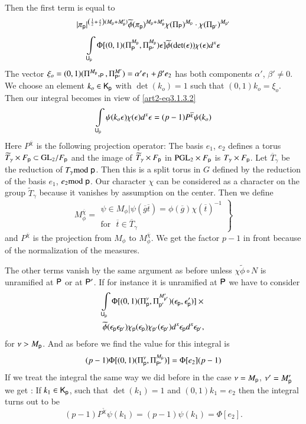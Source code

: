 Then the first term is equal to
\begin{gather*}
|\pi_{\mathsf{p}}|^{\left(\frac{1}{2}+\frac{s}{2}\right)(M_{\mathsf{p}}+M'_{\mathsf{p}})}\widetilde{\phi}(\pi_{\mathsf{p}})^{M_{\mathsf{p}}+M'_{\mathsf{p}}}\chi(\Pi_{\mathsf{P}})^{M_{\mathsf{p}}}\cdot \chi(\Pi_{\mathsf{p}'})^{M_{\mathsf{p}'}}\\[4pt]
\int\limits_{\mathsf{U}_{\mathsf{p}}}\Phi[(0,1)(\Pi^{M_{\mathsf{p}}}_{\mathsf{P}},\Pi^{M_{\mathsf{p}}}_{\mathsf{P}'})\epsilon]\widetilde{\phi}(\det (\epsilon))\chi(\epsilon)d^{x}\epsilon
\end{gather*}
The vector $\xi_{o}=(0,1)(\Pi^{M_{\mathsf{p}}},_{\mathsf{P}},\Pi^{M'}_{\mathsf{P}'})=\alpha'e_{1}+\beta'e_{2}$ has both components $\alpha'$, $\beta'\neq 0$. We choose an element $k_{o}\in \mathsf{K}_{\mathsf{p}}$ with $\det (k_{o})=1$ such that $(0,1)k_{o}=\xi_{o}$. Then our integral becomes in view of \eqref{art2-eq3.1.3.2}
$$
\int\limits_{\mathsf{U}_{\mathsf{p}}}\psi(k_{o}\epsilon)\chi(\epsilon)d^{x}\epsilon=(p-1)P^{\overline{\chi}}\psi(k_{o})
$$
Here $P^{\overline{\chi}}$ is the following projection operator: The basis $e_{1}$, $e_{2}$ defines a torus $\widetilde{T}_{\gamma}\times F_{\mathsf{p}}\subset \mathrm{GL}_{2}/F_{\mathsf{p}}$ and the image of $\widetilde{T}_{\gamma}\times F_{\mathsf{p}}$ in $\mathrm{PGL}_{2}\times F_{\mathsf{p}}$ is $T_{\gamma}\times F_{\mathsf{p}}$. Let $\overline{T}_{\gamma}$ be the reduction of $T_{\gamma}{\rm{mod}}\kern.3em \mathsf{p}$. Then this is a split torus in $G$ defined by the reduction of the basis $e_{1}$, $e_{2}{\rm{mod}}\kern.3em\mathsf{p}$. Our character $\chi$ can be considered as a character on the group $\widetilde{T}_{\gamma}$ because it vanishes by assumption on the center. Then we define
$$
M^{\overline{\chi}}_{\phi}=
\left.
\begin{array}{c}
\psi\in M_{\phi}|\psi(\overline{g}\overline{t})=\phi(\overline{g})\chi(\overline{t})^{-1}\\[4pt]
\text{for~ } \overline{t}\in \overline{T}_{\gamma}
\end{array}
\right\}
$$
and $P^{\overline{\chi}}$ is the projection from $M_{\phi}$ to $M^{\overline{\chi}}_{\phi}$. We get the factor $p-1$ in front because of the normalization of the measures.

The other terms vanish by the same argument as before unless $\chi\widetilde{\phi}\circ N$ is unramified at $\mathsf{P}$ or at $\mathsf{P}'$. If for instance it is unramified at $\mathsf{P}$ we have to consider
\begin{gather*}
\int\limits_{\mathsf{U}_{\mathsf{p}}}\Phi[(0,1)(\Pi^{\nu}_{\mathsf{p}},\Pi^{M'_{\mathsf{p}'}}_{\mathsf{p}'})(\epsilon_{\mathsf{p}},\epsilon'_{\mathsf{p}})]\times{}\\
\widetilde{\phi}(\epsilon_{\mathsf{p}}\epsilon_{\mathsf{p}'})\chi_{\mathsf{p}}(\epsilon_{\mathsf{p}})\chi_{\mathsf{p}'}(\epsilon_{\mathsf{p}'})d^{x}\epsilon_{\mathsf{p}}d^{x}\epsilon_{\mathsf{p}'},
\end{gather*}
for $\nu>M_{\mathsf{p}}$. And as before we find the value for this integral is
$$
(p-1)\Phi[(0,1)(\Pi^{\nu}_{\mathsf{p}},\Pi^{M_{\mathsf{p}}}_{\mathsf{P}'})]=\Phi[e_{2}](p-1)
$$
If we treat the integral the same way we did before in the case $\nu=M_{\mathsf{p}}$, $\nu'=M'_{\mathsf{p}}$ we get : If $k_{1}\in\mathsf{K}_{\mathsf{p}}$, such that $\det(k_{1})=1$ and $(0,1)k_{1}=e_{2}$ then the integral turns out to be
$$
(p-1)P^{\widetilde{\chi}}\psi(k_{1})=(p-1)\psi(k_{1})=\Phi[e_{2}].
$$\pageoriginale
